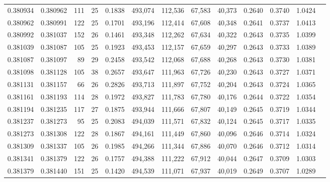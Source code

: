 \begin{tabular}{rrrrrrrrrrrrr}
0.380934 & 0.380962 &   111 &  25 &                                     0.1838 & 493,074 & 112,536 &  67,583 &  40,373 & 0.2640 & 0.3740 & 1.0424 \\
0.380962 & 0.380991 &   122 &  25 &                                     0.1701 & 493,196 & 112,414 &  67,608 &  40,348 & 0.2641 & 0.3737 & 1.0413 \\
0.380992 & 0.381037 &   152 &  26 &                                     0.1461 & 493,348 & 112,262 &  67,634 &  40,322 & 0.2643 & 0.3735 & 1.0399 \\
0.381039 & 0.381087 &   105 &  25 &                                     0.1923 & 493,453 & 112,157 &  67,659 &  40,297 & 0.2643 & 0.3733 & 1.0389 \\
0.381087 & 0.381097 &    89 &  29 &                                     0.2458 & 493,542 & 112,068 &  67,688 &  40,268 & 0.2643 & 0.3730 & 1.0381 \\
0.381098 & 0.381128 &   105 &  38 &                                     0.2657 & 493,647 & 111,963 &  67,726 &  40,230 & 0.2643 & 0.3727 & 1.0371 \\
0.381131 & 0.381157 &    66 &  26 &                                     0.2826 & 493,713 & 111,897 &  67,752 &  40,204 & 0.2643 & 0.3724 & 1.0365 \\
0.381161 & 0.381193 &   114 &  28 &                                     0.1972 & 493,827 & 111,783 &  67,780 &  40,176 & 0.2644 & 0.3722 & 1.0354 \\
0.381194 & 0.381235 &   117 &  27 &                                     0.1875 & 493,944 & 111,666 &  67,807 &  40,149 & 0.2645 & 0.3719 & 1.0344 \\
0.381237 & 0.381273 &    95 &  25 &                                     0.2083 & 494,039 & 111,571 &  67,832 &  40,124 & 0.2645 & 0.3717 & 1.0335 \\
0.381273 & 0.381308 &   122 &  28 &                                     0.1867 & 494,161 & 111,449 &  67,860 &  40,096 & 0.2646 & 0.3714 & 1.0324 \\
0.381309 & 0.381337 &   105 &  26 &                                     0.1985 & 494,266 & 111,344 &  67,886 &  40,070 & 0.2646 & 0.3712 & 1.0314 \\
0.381341 & 0.381379 &   122 &  26 &                                     0.1757 & 494,388 & 111,222 &  67,912 &  40,044 & 0.2647 & 0.3709 & 1.0303 \\
0.381379 & 0.381440 &   151 &  25 &                                     0.1420 & 494,539 & 111,071 &  67,937 &  40,019 & 0.2649 & 0.3707 & 1.0289 \\

\end{tabular}
